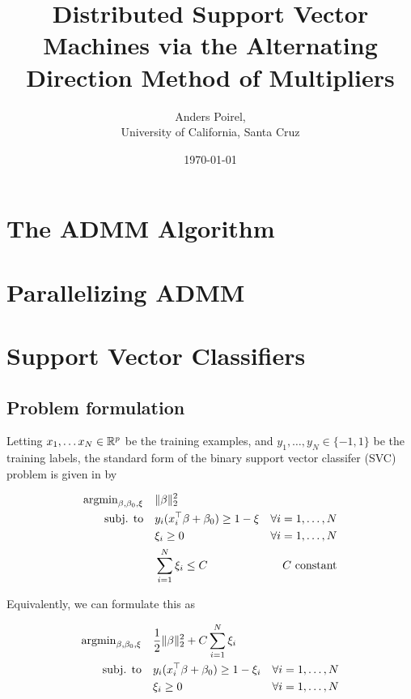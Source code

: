 \documentclass[11pt]{article}
\author{Anders Poirel, \\ University of California, Santa Cruz}
\date{\today}
\title{
    Distributed Support Vector Machines via the Alternating Direction Method of Multipliers
}
\begin{document}
\maketitle 

\section{The ADMM Algorithm}

\section{Parallelizing ADMM}

\section{Support Vector Classifiers}


\subsection{Problem formulation}

Letting $x_1, \ldots x_N \in \mathbb{R}^p$ be the training examples, and $y_1, \ldots, y_N \in \{-1,1\}$ be the training labels, 
the standard form of the binary support vector classifer (SVC) problem is given in   \cite{hastie2009elements} by

\begin{equation} \label{first_form}
\begin{aligned}
    \operatorname{argmin}_{\beta, \beta_0, \xi}  \quad 
    & \|\beta\|^2_2 & \\
    \textrm{subj. to} \quad 
    & y_i (x_i^\top \beta + \beta_0) \geq 1 - \xi & \forall i = 1, \ldots, N \\
    & \xi_i \geq 0  & \forall i = 1, \ldots, N \\
    & \sum_{i=1}^N \xi_i \leq C & C \textrm{ constant}
\end{aligned}
\end{equation}

Equivalently, we can formulate this as 

\begin{equation} \label{second_form}
\begin{aligned}
    \operatorname{argmin}_{\beta, \beta_0, \xi} \quad 
    & \frac{1}{2} \| \beta  \|_2^2 +  C \sum_{i=1}^N \xi_i & \\ 
    \textrm{subj. to}  \quad 
    & y_i (x_i^\top \beta + \beta_0) \geq 1 - \xi_i & \forall i = 1, \ldots, N \\
    & \xi_i \geq 0  & \forall i = 1, \ldots, N 
\end{aligned}
\end{equation}
\end{document}
